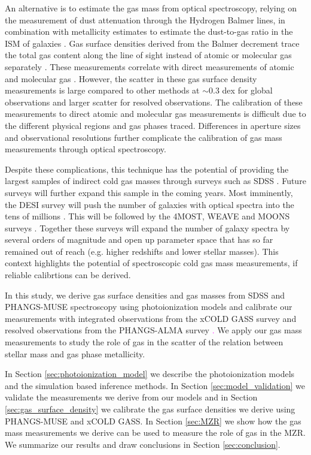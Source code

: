 \documentclass[fleqn,usenatbib]{mnras}
\begin{document}
An alternative is to estimate the gas mass from optical spectroscopy, relying on the measurement of dust attenuation through the Hydrogen Balmer lines, in combination with metallicity estimates to estimate the dust-to-gas ratio in the ISM of galaxies \citep{guver2009, heiderman2010, brinchmann2013}. Gas surface densities derived from the Balmer decrement trace the total gas content along the line of sight instead of atomic or molecular gas separately \citep{concas2019, barrera-ballesteros2020}. These measurements  correlate with direct measurements of atomic and molecular gas \citep{concas2019, yesuf2019, piotrowska2020, barrera-ballesteros2020}. However, the scatter in these gas surface density measurements is large compared to other methods at $\sim$0.3 dex for global observations and larger scatter for resolved observations. The calibration of these measurements to direct atomic and molecular gas measurements is difficult due to the different physical regions and gas phases traced. Differences in aperture sizes and observational resolutions further complicate the calibration of gas mass measurements through optical spectroscopy. 

Despite these complications, this technique has the potential of providing the largest samples of indirect cold gas masses through surveys such as SDSS \citep[][]{abazajian2009, piotrowska2020}. Future surveys will further expand this sample in the coming years. Most imminently, the DESI survey will push the number of galaxies with optical spectra into the tens of millions \citep{desi2022}. This will be followed by the 4MOST, WEAVE and MOONS surveys \citep[][]{driver2019, dalton2012, cirasuolo2020}. Together these surveys will expand the number of galaxy spectra by several orders of magnitude and open up parameter space that has so far remained out of reach (e.g. higher redshifts and lower stellar masses). This context highlights the potential of spectroscopic cold gas mass measurements, if reliable calibrtions can be derived.  

In this study, we derive gas surface densities and gas masses from SDSS and PHANGS-MUSE spectroscopy using photoionization models and calibrate our measurements with integrated observations from the xCOLD GASS survey and resolved observations from the PHANGS-ALMA survey \textcolor{magenta}{\citep[][]{emsellem2021, leroy2021}.} We apply our gas mass measurements to study the role of gas in the scatter of the relation between stellar mass and gas phase metallicity.

In Section \ref{sec:photoionization_model} we describe the photoionization models and the simulation based inference methods. In Section \ref{sec:model_validation} we validate the measurements we derive from our models and in Section \ref{sec:gas_surface_density} we calibrate the gas surface densities we derive using PHANGS-MUSE and xCOLD GASS. In Section \ref{sec:MZR} we show how the gas mass measurements we derive can be used to measure the role of gas in the MZR. We summarize our results and draw conclusions in Section \ref{sec:conclusion}.
\end{document}
